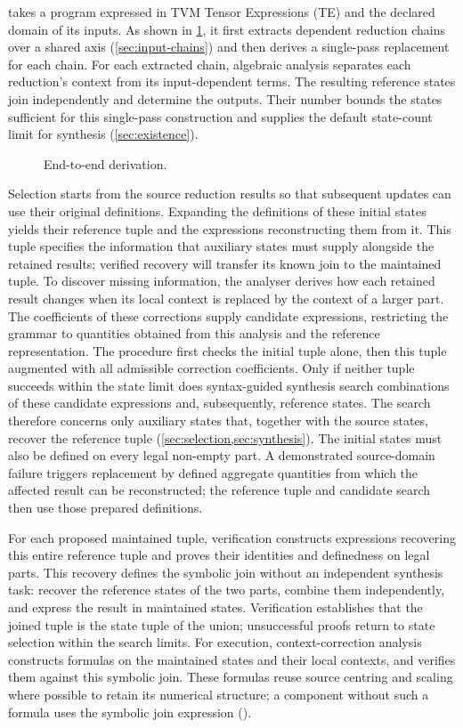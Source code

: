 \sys takes a program expressed in TVM Tensor Expressions (TE) and the declared domain of its inputs.
As shown in \cref{fig:pipeline}, it first extracts dependent reduction chains over a shared axis (\cref{sec:input-chains}) and then derives a single-pass replacement for each chain.
For each extracted chain, algebraic analysis separates each reduction's context from its input-dependent terms.
The resulting reference states join independently and determine the outputs.
Their number bounds the states sufficient for this single-pass construction and supplies the default state-count limit for synthesis (\cref{sec:existence}).

\begin{figure}
\centering

\caption{End-to-end derivation.}
\label{fig:pipeline}
\end{figure}
Selection starts from the source reduction results so that subsequent updates can use their original definitions.
Expanding the definitions of these initial states yields their reference tuple and the expressions reconstructing them from it.
This tuple specifies the information that auxiliary states must supply alongside the retained results; verified recovery will transfer its known join to the maintained tuple.
To discover missing information, the analyser derives how each retained result changes when its local context is replaced by the context of a larger part.
The coefficients of these corrections supply candidate expressions, restricting the grammar to quantities obtained from this analysis and the reference representation.
The procedure first checks the initial tuple alone, then this tuple augmented with all admissible correction coefficients.
Only if neither tuple succeeds within the state limit does syntax-guided synthesis search combinations of these candidate expressions and, subsequently, reference states.
The search therefore concerns only auxiliary states that, together with the source states, recover the reference tuple (\cref{sec:selection,sec:synthesis}).
The initial states must also be defined on every legal non-empty part.
A demonstrated source-domain failure triggers replacement by defined aggregate quantities from which the affected result can be reconstructed; the reference tuple and candidate search then use those prepared definitions.

For each proposed maintained tuple, verification constructs expressions recovering this entire reference tuple and proves their identities and definedness on legal parts.
This recovery defines the symbolic join without an independent synthesis task: recover the reference states of the two parts, combine them independently, and express the result in maintained states.
Verification establishes that the joined tuple is the state tuple of the union; unsuccessful proofs return to state selection within the search limits.
For execution, context-correction analysis constructs formulas on the maintained states and their local contexts, and verifies them against this symbolic join.
These formulas reuse source centring and scaling where possible to retain its numerical structure; a component without such a formula uses the symbolic join expression ().

